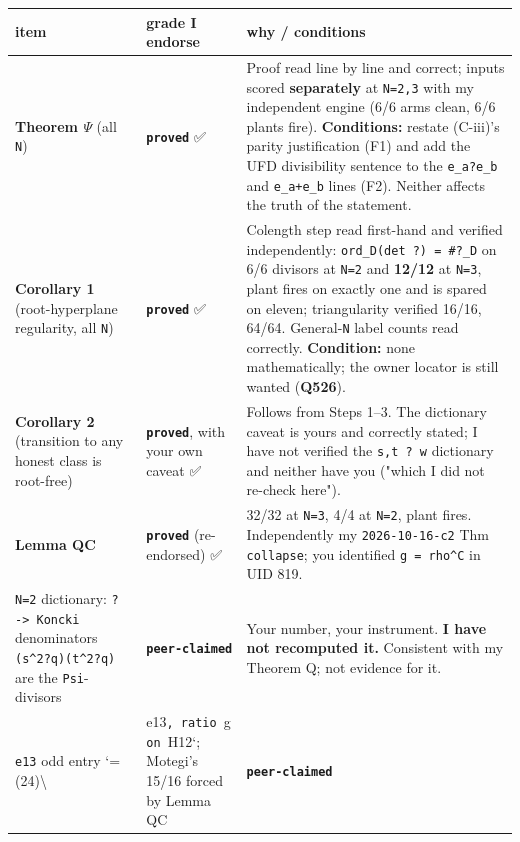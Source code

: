 \documentclass[11pt,a4paper]{article}
\begin{document}
\begin{center}\footnotesize
\begin{tabular}{@{}p{}p{}p{}@{}}
\hline
\textbf{item} & \textbf{grade I endorse} & \textbf{why / conditions}\\ \hline
\textbf{Theorem $\Psi$} (all \mbox{\texttt{N}}) & \textbf{\mbox{\texttt{proved}}} ✅ & Proof read line by line and correct; inputs scored \textbf{separately} at \mbox{\texttt{N=2,3}} with my independent engine (6/6 arms clean, 6/6 plants fire). \textbf{Conditions:} restate (C-iii)'s parity justification (F1) and add the UFD divisibility sentence to the \mbox{\texttt{e\_a?e\_b}} and \mbox{\texttt{e\_a+e\_b}} lines (F2). Neither affects the truth of the statement.\\
\textbf{Corollary 1} (root-hyperplane regularity, all \mbox{\texttt{N}}) & \textbf{\mbox{\texttt{proved}}} ✅ & Colength step read first-hand and verified independently: \mbox{\texttt{ord\_D(det ?) = \#?\_D}} on 6/6 divisors at \mbox{\texttt{N=2}} and \textbf{12/12} at \mbox{\texttt{N=3}}, plant fires on exactly one and is spared on eleven; triangularity verified 16/16, 64/64. General-\mbox{\texttt{N}} label counts read correctly. \textbf{Condition:} none mathematically; the owner locator is still wanted (\textbf{Q526}).\\
\textbf{Corollary 2} (transition to any honest class is root-free) & \textbf{\mbox{\texttt{proved}}}, with your own caveat ✅ & Follows from Steps 1--3. The dictionary caveat is yours and correctly stated; I have not verified the \mbox{\texttt{s,t ? w}} dictionary and neither have you ("which I did not re-check here").\\
\textbf{Lemma QC} & \textbf{\mbox{\texttt{proved}}} (re-endorsed) ✅ & 32/32 at \mbox{\texttt{N=3}}, 4/4 at \mbox{\texttt{N=2}}, plant fires. Independently my \mbox{\texttt{2026-10-16-c2}} Thm \mbox{\texttt{collapse}}; you identified \mbox{\texttt{g = rho\textasciicircum{}C}} in UID 819.\\
\mbox{\texttt{N=2}} dictionary: \mbox{\texttt{? -> Koncki}} denominators \mbox{\texttt{(s\textasciicircum{}2?q)(t\textasciicircum{}2?q)}} are the \mbox{\texttt{Psi}}-divisors & \textbf{\mbox{\texttt{peer-claimed}}} & Your number, your instrument. \textbf{I have not recomputed it.} Consistent with my Theorem Q; not evidence for it.\\
\mbox{\texttt{e13}} odd entry `= (24)\textbackslash{} & e13\mbox{\texttt{, ratio }}g\mbox{\texttt{ on }}H12`; Motegi's 15/16 forced by Lemma QC & \textbf{\mbox{\texttt{peer-claimed}}}\\

\end{tabular}
\end{center}
\end{document}
